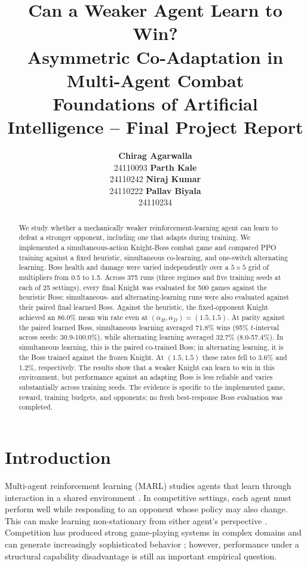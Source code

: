 \documentclass{article}
\title{Can a Weaker Agent Learn to Win?\\
Asymmetric Co-Adaptation in Multi-Agent Combat\\
\large Foundations of Artificial Intelligence -- Final Project Report}
\author{
  \textbf{Chirag Agarwalla} \\
  24110093
  \And
  \textbf{Parth Kale} \\
  24110242
  \And
  \textbf{Niraj Kumar} \\
  24110222
  \And
  \textbf{Pallav Biyala} \\
  24110234
}
\begin{document}
\maketitle

\begin{abstract}
We study whether a mechanically weaker reinforcement-learning agent can learn to defeat a stronger opponent, including one that adapts during training. We implemented a simultaneous-action Knight-Boss combat game and compared PPO training against a fixed heuristic, simultaneous co-learning, and one-switch alternating learning. Boss health and damage were varied independently over a $5\times5$ grid of multipliers from 0.5 to 1.5. Across 375 runs (three regimes and five training seeds at each of 25 settings), every final Knight was evaluated for 500 games against the heuristic Boss; simultaneous- and alternating-learning runs were also evaluated against their paired final learned Boss. Against the heuristic, the fixed-opponent Knight achieved an 86.0\% mean win rate even at $(\alpha_H,\alpha_D)=(1.5,1.5)$. At parity against the paired learned Boss, simultaneous learning averaged 71.8\% wins (95\% $t$-interval across seeds: 30.9-100.0\%), while alternating learning averaged 32.7\% (8.0-57.4\%). In simultaneous learning, this is the paired co-trained Boss; in alternating learning, it is the Boss trained against the frozen Knight. At $(1.5,1.5)$ these rates fell to 3.6\% and 1.2\%, respectively. The results show that a weaker Knight can learn to win in this environment, but performance against an adapting Boss is less reliable and varies substantially across training seeds. The evidence is specific to the implemented game, reward, training budgets, and opponents; no fresh best-response Boss evaluation was completed.

\end{abstract}


\section{Introduction}
Multi-agent reinforcement learning (MARL) studies agents that learn through interaction in a shared environment \cite{busoniu2008comprehensive,zhang2021multi}. In competitive settings, each agent must perform well while responding to an opponent whose policy may also change. This can make learning non-stationary from either agent's perspective \cite{hernandez2020survey}. Competition has produced strong game-playing systems in complex domains \cite{vinyals2019grandmaster} and can generate increasingly sophisticated behavior \cite{bansal2018emergent}; however, performance under a structural capability disadvantage is still an important empirical question.
\end{document}
